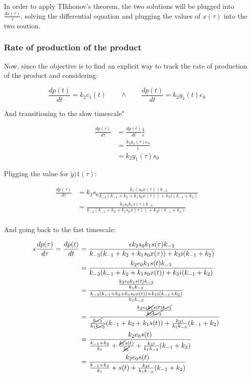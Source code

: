     In order to apply TIkhonov's theorem, the two solutions will be plugged into $\frac{dx(\tau)}{\tau}$, solving the differential equation and plugging the values of $x(\tau)$ into the two soution.

    \subsubsection{Rate of production of the product}
    Now, since the objective is to find an explicit way to track the rate of production of the product and considering:

    $$\frac{dp(t)}{dt} = k_2c_1(t) \qquad\land\qquad \frac{dp(t)}{dt} = k_2y_1(t)e_0$$

    And transitioning to the slow timescale"

    \begin{align*}
      \frac{dp(\tau)}{d\tau} &= \frac{dp(t)}{dt}\frac{1}{\epsilon}\\
                             &= \frac{k_2y_1(\tau)e_0}{\epsilon}\\
                             &= k_2y_1(\tau)s_0
    \end{align*}

    Pligging the value for $\tilde{y})1(\tau)$:

    \begin{align*}
      \frac{dp(\tau)}{d\tau} &= k_2s_0\frac{k_1(s_0x(\tau))k_{-3}}{k_{-3}(k_{-1} + k_2 + k_1s_0x(\tau)) + k_3i(k_{-1} + k_2)}\\
      &= \frac{k_2s_0k_1s(\tau)k_{-3}}{k_{-3}(k_{-1} + k_2 + k_1s_0x(\tau)) + k_3i(k_{-1} + k_2)}\\
    \end{align*}

    And going back to the fast timescale:

    \begin{align*}
      \epsilon\frac{dp(\tau)}{d\tau} = \frac{dp(t)}{dt} &= \frac{\epsilon k_2s_0k_1s(\tau)k_{-3}}{k_{-3}(k_{-1} + k_2 + k_1s_0x(\tau)) + k_3i(k_{-1} + k_2)}\\
                                                        &=\frac{k_2e_0k_1s(t)k_{-3}}{k_{-3}(k_{-1} + k_2 + k_1s_0x(t)) + k_3i(k_{-1} + k_2)}\\
                                                        &=\frac{\frac{k_2e_0k_1s(t)k_{-3}}{k_1k_{-3}}}{\frac{k_{-3}(k_{-1} + k_2 + k_1s_0x(t)) + k_3i(k_{-1} + k_2)}{k_1k_{-3}}}\\
                                                        &=\frac{\frac{k_2e_0\cancel{k_1}s(t)\cancel{k_{-3}}}{\cancel{k_1}\cancel{k_{-3}}}}{\frac{\cancel{k_{-3}}}{k_1\cancel{k_{-3}}}(k_{-1} + k_2 + k_1s(t)) + \frac{k_3i}{k_1k_{-3}}(k_{-1} + k_2)}\\
                                                        &=\frac{k_2e_0s(t)}{\frac{k_{-1} + k_2}{k_1} + \frac{\cancel{k_1}s(t)}{\cancel{k_1}} + \frac{k_3i}{k_1k_{-3}}(k_{-1} + k_2)}\\
                                                        &=\frac{k_2e_0s(t)}{\frac{k_{-1} + k_2}{k_1} + s(t) + \frac{k_3i}{k_1k_{-3}}(k_{-1} + k_2)}\\
    \end{align*}

